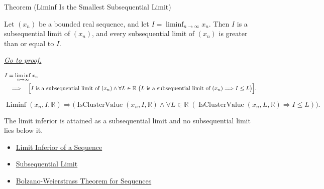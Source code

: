 
\begin{theorembox}{Theorem (Liminf Is the Smallest Subsequential Limit)}
\begin{theorem}
\label{thm:liminf-smallest-subsequential-limit}
Let $(x_n)$ be a bounded real sequence, and let
$I=\liminf_{n\to\infty}x_n$. Then $I$ is a subsequential limit of
$(x_n)$, and every subsequential limit of $(x_n)$ is greater than or
equal to $I$.

\smallskip
\noindent
\hyperref[prf:liminf-smallest-subsequential-limit]{\textit{Go to proof.}}
\end{theorem}
\end{theorembox}

\begin{remark*}
\[
\begin{aligned}
&I=\liminf_{n\to\infty}x_n\\
&\quad\Longrightarrow\quad
\Bigl[
  I\text{ is a subsequential limit of }(x_n)
  \land
  \forall L\in\mathbb{R}\;
  \bigl(L\text{ is a subsequential limit of }(x_n)\Longrightarrow I\le L\bigr)
\Bigr].
\end{aligned}
\]
\end{remark*}

\begin{remark*}
\[
\operatorname{Liminf}(x_n,I,\mathbb{R})
\Longrightarrow
\bigl(
  \operatorname{IsClusterValue}(x_n,I,\mathbb{R})
  \land
  \forall L\in\mathbb{R}\;
  (\operatorname{IsClusterValue}(x_n,L,\mathbb{R})\Longrightarrow I\le L)
\bigr).
\]
\end{remark*}

\begin{remark*}[Interpretation]
The limit inferior is attained as a subsequential limit and no subsequential
limit lies below it.
\end{remark*}

\begin{dependencies}
\begin{itemize}
  \item \hyperref[def:liminf-sequence]{Limit Inferior of a Sequence}
  \item \hyperref[def:subsequential-limit]{Subsequential Limit}
  \item \hyperref[thm:bolzano-weierstrass-sequences]{Bolzano-Weierstrass Theorem for Sequences}
\end{itemize}
\end{dependencies}

